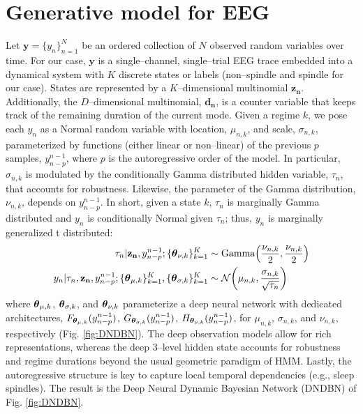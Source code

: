 \documentclass[runningheads]{llncs}
\begin{document}
\section{Generative model for EEG}
\label{sec:methods}
Let $\mathbf{y} = \{y_n\}_{n=1}^N$ be an ordered collection of $N$ observed random variables over time. For our case, $\mathbf{y}$ is a single--channel, single--trial EEG trace embedded into a dynamical system with $K$ discrete states or labels (non--spindle and spindle for our case). States are represented by a $K$--dimensional multinomial $\mathbf{z_n}$. Additionally, the $D$--dimensional multinomial, $\mathbf{d_n}$, is a counter variable that keeps track of the remaining duration of the current mode. Given a regime $k$, we pose each $y_n$ as a Normal random variable with location, $\mu_{n,k}$, and scale, $\sigma_{n,k}$, parameterized by functions (either linear or non--linear) of the previous $p$ samples, $y_{n-p}^{n-1}$, where $p$ is the autoregressive order of the model. In particular, $\sigma_{n,k}$ is modulated by the conditionally Gamma distributed hidden variable, $\tau_n$, that accounts for robustness. Likewise, the parameter of the Gamma distribution, $\nu_{n,k}$, depends on $y_{n-p}^{n-1}$. In short, given a state $k$, $\tau_n$ is marginally Gamma distributed and $y_n$ is conditionally Normal given $\tau_n$; thus, $y_n$ is marginally generalized t distributed:
\begin{align}
	\tau_n | \mathbf{z_n}, y_{n-p}^{n-1}; \{\text{\boldmath$\theta$\unboldmath}_{\nu, k}\}_{k=1}^K &\sim \text{Gamma}\Big(\frac{\nu_{n,k}}{2},
	\frac{\nu_{n,k}}{2}\Big)\\
	y_n | \tau_n, \mathbf{z_n}, y_{n-p}^{n-1};  \{\text{\boldmath$\theta$\unboldmath}_{\mu,k}\}_{k=1}^K, \{\text{\boldmath$\theta$\unboldmath}_{\sigma,k}\}_{k=1}^K  &\sim \mathcal{N} \bigg( \mu_{n,k}, \frac{\sigma_{n,k}}{\sqrt{\tau_n}} \bigg)
	\label{eq:Obs}
\end{align}
where $\text{\boldmath$\theta$\unboldmath}_{\mu, k}$, $\text{\boldmath$\theta$\unboldmath}_{\sigma, k}$, and $\text{\boldmath$\theta$\unboldmath}_{\nu, k}$ parameterize a deep neural network with dedicated architectures, $F_{\text{\boldmath$\theta$\unboldmath}_{\mu, k}}(y_{n-p}^{n-1})$, $G_{\text{\boldmath$\theta$\unboldmath}_{\sigma, k}}(y_{n-p}^{n-1})$, $H_{\text{\boldmath$\theta$\unboldmath}_{\nu, k}}(y_{n-p}^{n-1})$, for $\mu_{n,k}$, $\sigma_{n,k}$, and $\nu_{n,k}$, respectively (Fig. \ref{fig:DNDBN}). The deep observation models allow for rich representations, whereas the deep 3--level hidden state accounts for robustness and regime durations beyond the usual geometric paradigm of HMM. Lastly, the autoregressive structure is key to capture local temporal dependencies (e.g.,  sleep spindles). The result is the Deep Neural Dynamic Bayesian Network (DNDBN) of Fig. \ref{fig:DNDBN}.
\end{document}
